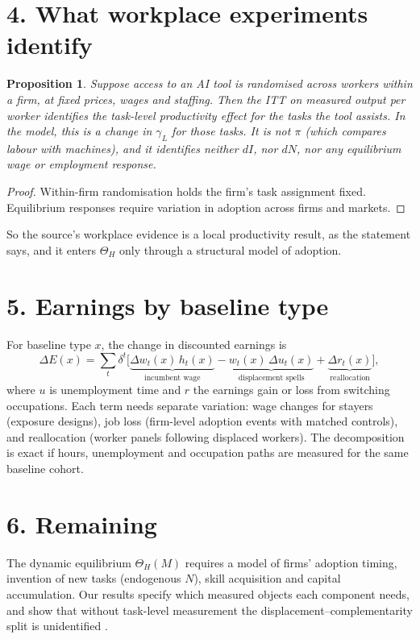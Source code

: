 \documentclass[11pt]{article}
\newtheorem{proposition}[theorem]{Proposition}
\theoremstyle{definition}
\begin{document}
\section*{4. What workplace experiments identify}
\begin{proposition}\label{prop:rct}
Suppose access to an AI tool is randomised across workers within a firm, at fixed prices, wages and staffing. Then the ITT on
measured output per worker identifies the task-level productivity effect for the tasks the tool assists. In the model, this
is a change in $\gamma_L$ for those tasks. It is not $\pi$ (which compares labour with machines), and it identifies neither
$dI$, nor $dN$, nor any equilibrium wage or employment response.
\end{proposition}
\begin{proof}
Within-firm randomisation holds the firm's task assignment fixed. Equilibrium responses require variation in adoption across
firms and markets.
\end{proof}
So the source's workplace evidence \cite{blr} is a local productivity result, as the statement says, and it enters
$\Theta_H$ only through a structural model of adoption.

\section*{5. Earnings by baseline type}
For baseline type $x$, the change in discounted earnings is
\[
 \Delta E(x)=\sum_t\delta^t\bigl[\underbrace{\Delta w_t(x)\,h_t(x)}_{\text{incumbent wage}}-\underbrace{w_t(x)\,\Delta u_t(x)}_{\text{displacement spells}}+\underbrace{\Delta r_t(x)}_{\text{reallocation}}\bigr],
\]
where $u$ is unemployment time and $r$ the earnings gain or loss from switching occupations. Each term needs separate
variation: wage changes for stayers (exposure designs), job loss (firm-level adoption events with matched controls), and
reallocation (worker panels following displaced workers). The decomposition is exact if hours, unemployment and occupation
paths are measured for the same baseline cohort.

\section*{6. Remaining}
The dynamic equilibrium $\Theta_H(M)$ requires a model of firms' adoption timing, invention of new tasks (endogenous $N$),
skill acquisition and capital accumulation. Our results specify which measured objects each component needs, and show that
without task-level measurement the displacement--complementarity split is unidentified \cite{alm,ar,blr}.
\end{document}
